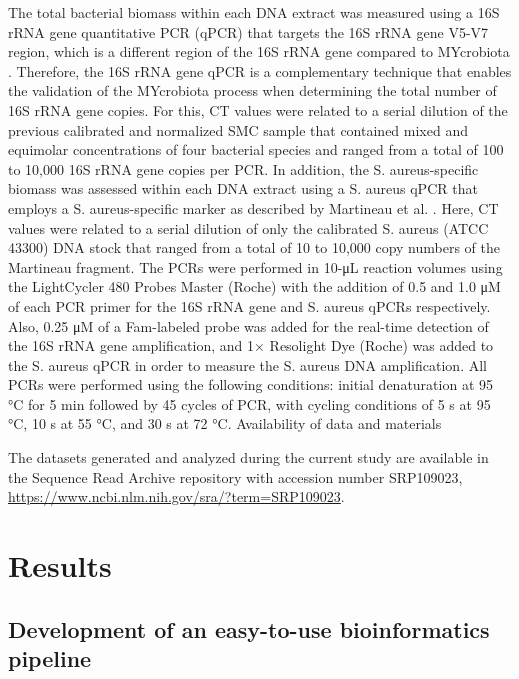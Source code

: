 The total bacterial biomass within each DNA extract was measured using a 16S rRNA gene quantitative PCR (qPCR) that targets the 16S rRNA gene V5-V7 region, which is a different region of the 16S rRNA gene compared to MYcrobiota \cite{yang2002quantitative}. Therefore, the 16S rRNA gene qPCR is a complementary technique that enables the validation of the MYcrobiota process when determining the total number of 16S rRNA gene copies. For this, CT values were related to a serial dilution of the previous calibrated and normalized SMC sample that contained mixed and equimolar concentrations of four bacterial species and ranged from a total of 100 to 10,000 16S rRNA gene copies per PCR. In addition, the S. aureus-specific biomass was assessed within each DNA extract using a S. aureus qPCR that employs a S. aureus-specific marker as described by Martineau et al. \cite{martineau1998species}. Here, CT values were related to a serial dilution of only the calibrated S. aureus (ATCC 43300) DNA stock that ranged from a total of 10 to 10,000 copy numbers of the Martineau fragment. The PCRs were performed in 10-μL reaction volumes using the LightCycler 480 Probes Master (Roche) with the addition of 0.5 and 1.0 μM of each PCR primer for the 16S rRNA gene and S. aureus qPCRs respectively. Also, 0.25 μM of a Fam-labeled probe was added for the real-time detection of the 16S rRNA gene amplification, and 1× Resolight Dye (Roche) was added to the S. aureus qPCR in order to measure the S. aureus DNA amplification. All PCRs were performed using the following conditions: initial denaturation at 95 °C for 5 min followed by 45 cycles of PCR, with cycling conditions of 5 s at 95 °C, 10 s at 55 °C, and 30 s at 72 °C.
Availability of data and materials

The datasets generated and analyzed during the current study are available in the Sequence Read Archive repository with accession number SRP109023, \url{https://www.ncbi.nlm.nih.gov/sra/?term=SRP109023}.


\section*{Results}

\subsection{Development of an easy-to-use bioinformatics pipeline}

